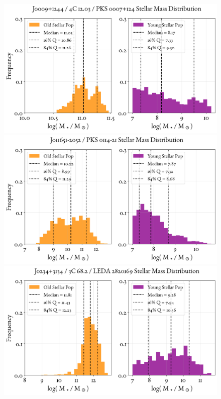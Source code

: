\begin{figure}
    \centering
    \includegraphics[width=0.8\linewidth]{figures/ResultMasses/111_MassDistri_5325.png}\\
    \includegraphics[width=0.8\linewidth]{figures/ResultMasses/112_MassDistri_5348.png}\\
    \includegraphics[width=0.8\linewidth]{figures/ResultMasses/113_MassDistri_5349.png}    
\end{figure}
